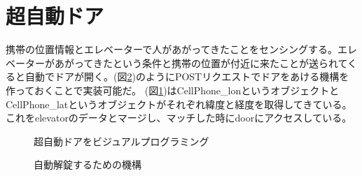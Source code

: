 \section{超自動ドア}
携帯の位置情報とエレベーターで人があがってきたことをセンシングする。エレベーターがあがってきたという条件と携帯の位置が付近に来たことが送られてくると自動でドアが開く。(図\ref{fig:image14})のようにPOSTリクエストでドアをあける機構を作っておくことで実装可能だ。
(図\ref{fig:image11})はCellPhone\_lonというオブジェクトとCellPhone\_latというオブジェクトがそれぞれ緯度と経度を取得してきている。これをelevatorのデータとマージし、マッチした時にdoorにアクセスしている。
\begin{figure}[htbp]
  \begin{center}
  \end{center}
  \caption{超自動ドアをビジュアルプログラミング}
  \label{fig:image11}
\end{figure}

\begin{figure}[htbp]
  \begin{center}
  \end{center}
  \caption{自動解錠するための機構}
  \label{fig:image14}
\end{figure}

